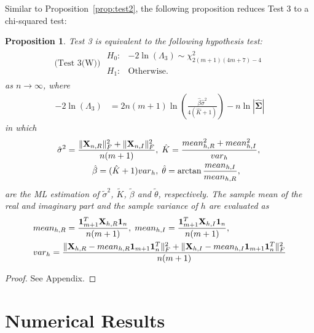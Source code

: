 \documentclass[journal,draftcls,onecolumn,12pt,twoside]{IEEEtran}
\newtheorem{proposition}{Proposition}
\begin{document}
Similar to Proposition~\ref{prop:test2}, the following proposition reduces Test
3 to a chi-squared test:
\begin{proposition}
  \label{prop:test3}
  Test 3 is equivalent to the following hypothesis test:
  \begin{align}
    \mbox{(Test 3(W)) } \begin{array}{ll}H_0: & -2\ln(\Lambda_3) \sim
    \chi_{2(m+1)(4m+7)-4}^2 \\ H_1: & \mbox{Otherwise.}
    \end{array}
  \end{align}
  as $n\rightarrow\infty$, where
  \begin{align}
    -2\ln(\Lambda_3) & =
    2n(m+1)\ln\left(\frac{\hat{\beta} \hat{\sigma}^2} {4(\hat{K}+1)}\right) -
    n\ln|\hat{\mathbf{\Sigma}}|
  \end{align}
  in which
  \begin{align}
    \hat{\sigma}^2 = \frac{\|\mathbf{X}_{n,R}\|_F^2 +
    \|\mathbf{X}_{n,I}\|_F^2}{n(m+1)} & ,\; 
    \hat{K} = \frac{\mbox{mean}_{h,R}^2 + \mbox{mean}_{h,I}^2}{\mbox{var}_h},\;
    \notag\\
    \hat{\beta} = (\hat{K} + 1)\mbox{var}_h & ,\;
    \hat{\theta} =
    \arctan\frac{\mbox{mean}_{h,I}}{\mbox{mean}_{h,R}}, \label{eq:beta_sigma_ml}
  \end{align}
  are the ML estimation of $\tilde{\sigma}^2$, $\tilde{K}$, $\tilde{\beta}$ and
  $\tilde{\theta}$, respectively. The sample mean of the real and imaginary part
  and the sample variance of $h$ are evaluated as
  \begin{align}
    & \mbox{mean}_{h,R} =
    \frac{\mathbf{1}_{m+1}^T\mathbf{X}_{h,R}\mathbf{1}_n} {n(m+1)} ,\;
    \mbox{mean}_{h,I} = \frac{\mathbf{1}_{m+1}^T\mathbf{X}_{h,I}\mathbf{1}_n}
    {n(m+1)},\notag \\
    & \mbox{var}_h = \frac{\|\mathbf{X}_{h,R} -
    \mbox{mean}_{h,R}\mathbf{1}_{m+1}\mathbf{1}_{n}^T\|_F^2 +
    \|\mathbf{X}_{h,I} - \mbox{mean}_{h,I}\mathbf{1}_{m+1}\mathbf{1}_{n}^T\|_F^2}{n(m+1)}
  \end{align}
\end{proposition}
\begin{proof}
  See Appendix.
\end{proof}

\section{Numerical Results}
\label{sec:numerical}
\end{document}
